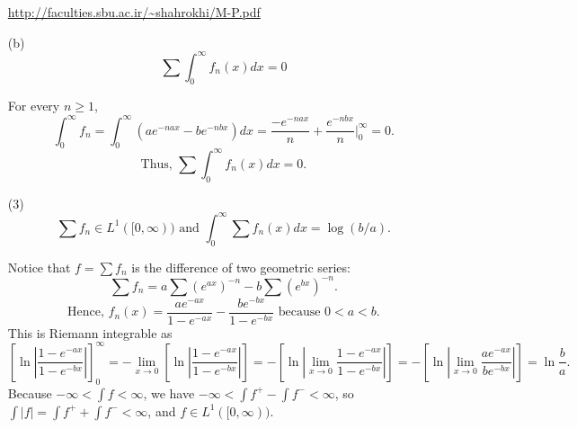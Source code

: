 \begin{enumerate}
\url{http://faculties.sbu.ac.ir/~shahrokhi/M-P.pdf}
\item[(b)] \[
\sum \int_0^\infty f_n(x)dx = 0\]
\begin{pf}
For every $n \geq 1$, 
\[
\int_0^\infty f_n = \int_0^\infty \left( ae^{-nax}-be^{-nbx}\right)dx =  \frac{-e^{-nax}}{n}+\frac{e^{-nbx}}{n}\biggr|_0^\infty=0.
\]
\[
\text{Thus, } \sum \int_0^\infty f_n(x)dx = 0.
\]
\end{pf}
\item[(3)] 
\[ \sum f_n \in L^1([0,\infty)) \text{ and } \int_0^\infty \sum f_n(x)dx = \log (b/a). \]
\begin{pf}
Notice that $f=\sum f_n$ is the difference of two geometric series:
\[ \sum f_n =  a \sum (e^{ax})^{-n} - b \sum (e^{bx})^{-n}.
\]
\[\text{Hence, }f_n(x) = \frac{ae^{-ax}}{1-e^{-ax}}-\frac{be^{-bx}}{1-e^{-bx}} \text{ because } 0<a<b. \]
 This is Riemann integrable as $$\left[ \ln \left| \frac{1-e^{-ax}}{1-e^{-bx}}\right| \right]_0^\infty= -\lim_{x\to 0}\left[ \ln \left| \frac{1-e^{-ax}}{1-e^{-bx}}\right| \right] =-\left[ \ln \left| \lim_{x\to 0}\frac{1-e^{-ax}}{1-e^{-bx}}\right| \right]=-\left[ \ln \left| \lim_{x\to 0}\frac{ae^{-ax}}{be^{-bx}}\right| \right]=\ln \frac{b}{a}.$$  Because $-\! \infty \! < \int \! f  \! < \!\infty$, we have $-\infty < \int f^+\! -\! \int f^- < \infty$, so $\int |f| \! =\! \int f^+ + \int f^-\! <\! \infty$, and $f\in L^1([0,\infty))$.
\end{pf}
\end{enumerate}

